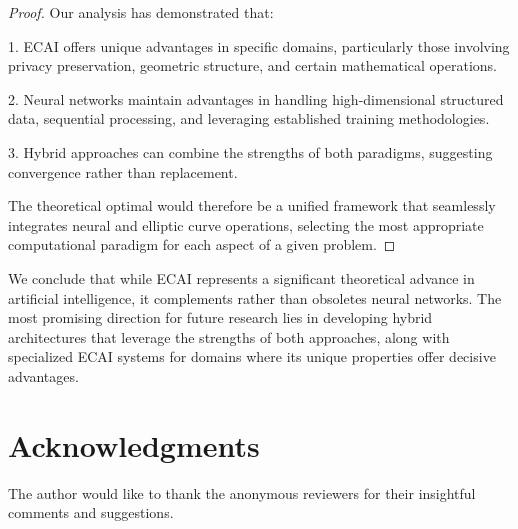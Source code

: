 \documentclass[12pt,a4paper]{article}
\theoremstyle{definition}
\begin{document}
\begin{proof}
Our analysis has demonstrated that:

1. ECAI offers unique advantages in specific domains, particularly those involving privacy preservation, geometric structure, and certain mathematical operations.

2. Neural networks maintain advantages in handling high-dimensional structured data, sequential processing, and leveraging established training methodologies.

3. Hybrid approaches can combine the strengths of both paradigms, suggesting convergence rather than replacement.

The theoretical optimal would therefore be a unified framework that seamlessly integrates neural and elliptic curve operations, selecting the most appropriate computational paradigm for each aspect of a given problem.
\end{proof}

We conclude that while ECAI represents a significant theoretical advance in artificial intelligence, it complements rather than obsoletes neural networks. The most promising direction for future research lies in developing hybrid architectures that leverage the strengths of both approaches, along with specialized ECAI systems for domains where its unique properties offer decisive advantages.

\section{Acknowledgments}
The author would like to thank the anonymous reviewers for their insightful comments and suggestions.
\end{document}
